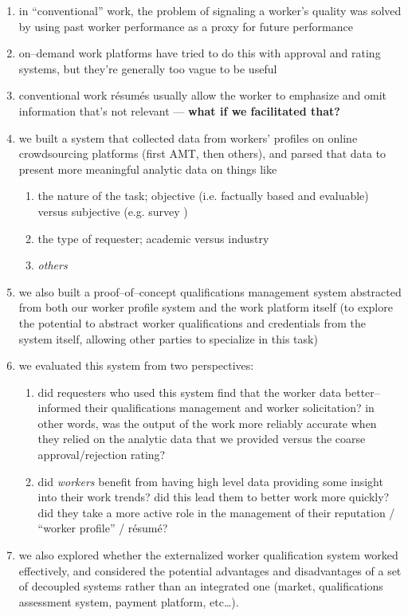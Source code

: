 \documentclass[main]{subfiles}
\begin{document}
\begin{enumerate}
  \item in ``conventional'' work, the problem of signaling a worker's quality was solved by using past worker performance as a proxy for future performance
  \item on--demand work platforms have tried to do this with approval and rating systems, but they're generally too vague to be useful
  \item conventional work r\'{e}sum\'{e}s usually allow the worker to emphasize and omit information that's not relevant --- \textbf{what if we facilitated that?}
  
  \item we built a system that collected data from workers' profiles on online crowdsourcing platforms
  (first AMT, then others), and parsed that data to present more meaningful analytic data on things like
  \begin{enumerate}
    \item the nature of the task; objective (i.e. factually based and evaluable) versus subjective (e.g. survey )
    \item the type of requester; academic versus industry
    \item \textit{others}
  \end{enumerate}
  \item we also built a proof--of--concept qualifications management system abstracted from both our worker profile system and the work platform itself
  (to explore the potential to abstract worker qualifications and credentials from the system itself, allowing other parties to specialize in this task)
  
  \item we evaluated this system from two perspectives:
  \begin{enumerate}
    \item did requesters who used this system find that the worker data better--informed their qualifications management and worker solicitation?
          in other words, was the output of the work more reliably accurate when they relied on the analytic data that we provided versus the coarse approval/rejection rating?
    \item did \textit{workers} benefit from having high level data providing some insight into their work trends? did this lead them to better work more quickly? did they take a more active role in the management of their reputation / ``worker profile'' / r\'{e}sum\'{e}?
  \end{enumerate}
  \item we also explored whether the externalized worker qualification system worked effectively, and considered the potential advantages and disadvantages of a set of decoupled systems rather than an integrated one (market, qualifications assessment system, payment platform, etc\dots).
\end{enumerate}
\end{document}
